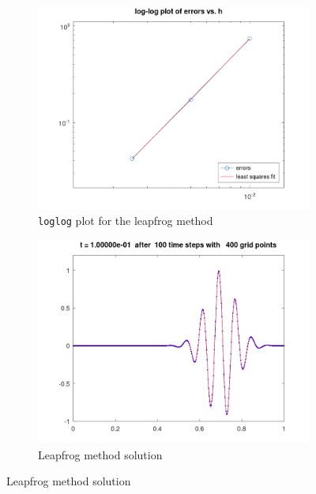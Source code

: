 \begin{solution}
    \begin{figure}[h]
        \centering
        \begin{subfigure}{0.45\textwidth}
            \includegraphics*[width=\textwidth]{problem_4b_error.png}
            \caption{\texttt{loglog} plot for the leapfrog method}
        \end{subfigure}
        \hfill
        \begin{subfigure}{0.45\textwidth}
            \includegraphics*[width=\textwidth]{problem_4b.png}
            \caption{Leapfrog method solution}
        \end{subfigure}
    \end{figure}


\end{solution}